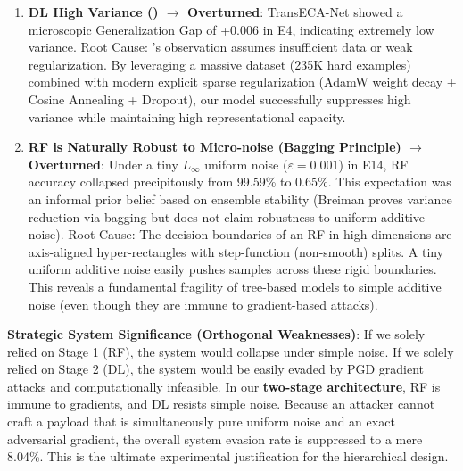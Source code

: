 \documentclass[sigconf]{acmart}
\begin{document}
\begin{enumerate}
\item \textbf{DL High Variance (\cite{5}) $\to$ Overturned}: TransECA-Net showed a microscopic Generalization Gap of +0.006 in E4, indicating extremely low variance. Root Cause: \cite{3}'s observation assumes insufficient data or weak regularization. By leveraging a massive dataset (235K hard examples) combined with modern explicit sparse regularization (AdamW weight decay + Cosine Annealing + Dropout), our model successfully suppresses high variance while maintaining high representational capacity.

\item \textbf{RF is Naturally Robust to Micro-noise (Bagging Principle) $\to$ Overturned}: Under a tiny $L_\infty$ uniform noise ($\varepsilon = 0.001$) in E14, RF accuracy collapsed precipitously from 99.59\% to 0.65\%. This expectation was an informal prior belief based on ensemble stability (Breiman \cite{11} proves variance reduction via bagging but does not claim robustness to uniform additive noise). Root Cause: The decision boundaries of an RF in high dimensions are axis-aligned hyper-rectangles with step-function (non-smooth) splits. A tiny uniform additive noise easily pushes samples across these rigid boundaries. This reveals a fundamental fragility of tree-based models to simple additive noise (even though they are immune to gradient-based attacks).
\end{enumerate}

\textbf{Strategic System Significance (Orthogonal Weaknesses)}: If we solely relied on Stage 1 (RF), the system would collapse under simple noise. If we solely relied on Stage 2 (DL), the system would be easily evaded by PGD gradient attacks and computationally infeasible. In our \textbf{two-stage architecture}, RF is immune to gradients, and DL resists simple noise. Because an attacker cannot craft a payload that is simultaneously pure uniform noise and an exact adversarial gradient, the overall system evasion rate is suppressed to a mere 8.04\%. This is the ultimate experimental justification for the hierarchical design.
\end{document}
